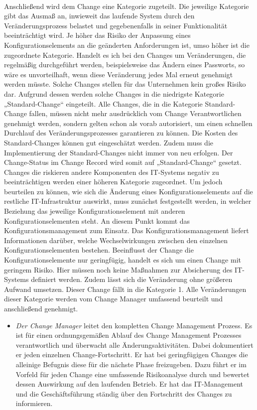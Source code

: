 \\
Anschließend wird dem Change eine Kategorie zugeteilt. Die jeweilige Kategorie gibt das Ausmaß an, inwieweit das laufende System durch den Veränderungsprozess belastet und gegebenenfalls in seiner Funktionalität beeinträchtigt wird. Je höher das Risiko der Anpassung eines Konfigurationselements an die geänderten Anforderungen ist, umso höher ist die zugeordnete Kategorie. Handelt es ich bei den Changes um Veränderungen, die regelmäßig durchgeführt werden, beispielsweise das Ändern eines Passworts, so wäre es unvorteilhaft, wenn diese Veränderung jedes Mal erneut genehmigt werden müsste. Solche Changes stellen für das Unternehmen kein großes Risiko dar. Aufgrund dessen werden solche Changes in die niedrigste Kategorie „Standard-Change“ eingeteilt. Alle Changes, die in die Kategorie Standard-Change fallen, müssen nicht mehr ausdrücklich vom Change Verantwortlichen genehmigt werden, sondern gelten schon als vorab autorisiert, um einen schnellen Durchlauf des Veränderungsprozesses garantieren zu können. Die Kosten des Standard-Changes können gut eingeschätzt werden. Zudem muss die Implementierung der Standard-Changes nicht immer von neu erfolgen. Der Change-Status im Change Record wird somit auf „Standard-Change“ gesetzt.
\\
Changes die riskieren andere Komponenten des IT-Systems negativ zu beeinträchtigen werden einer höheren Kategorie zugeordnet. Um jedoch beurteilen zu können, wie sich die Änderung eines Konfigurationselements auf die restliche IT-Infrastruktur auswirkt, muss zunächst festgestellt werden, in welcher Beziehung das jeweilige Konfigurationselement mit anderen Konfigurationselementen steht. An diesem Punkt kommt das Konfigurationsmanagement zum Einsatz. Das Konfigurationsmanagement liefert Informationen darüber,  welche Wechselwirkungen zwischen den einzelnen Konfigurationselementen bestehen. Beeinflusst der Change die Konfigurationselemente nur geringfügig, handelt es sich um einen Change mit geringem Risiko. Hier müssen noch keine Maßnahmen zur Absicherung des IT-Systems definiert werden. Zudem lässt sich die Veränderung ohne größeren Aufwand umsetzen. Dieser Change fällt in die Kategorie 1. Alle Veränderungen dieser Kategorie werden vom Change Manager umfassend beurteilt und anschließend genehmigt. 
\\
\begin{itemize}
	\item \textit{Der Change Manager} leitet den kompletten Change Management Prozess. Es ist für einen ordnungsgemäßen Ablauf des Change Management Prozesses verantwortlich und überwacht alle Änderungsaktivitäten. Dabei dokumentiert er jeden einzelnen Change-Fortschritt. Er hat bei geringfügigen Changes die alleinige Befugnis diese für die nächste Phase freizugeben. Dazu führt er im Vorfeld für jeden Change eine umfassende Risikoanalyse durch und bewertet dessen Auswirkung auf den laufenden Betrieb. Er hat das IT-Management und die Geschäftsführung ständig über den Fortschritt des Changes zu informieren.
\end{itemize}
